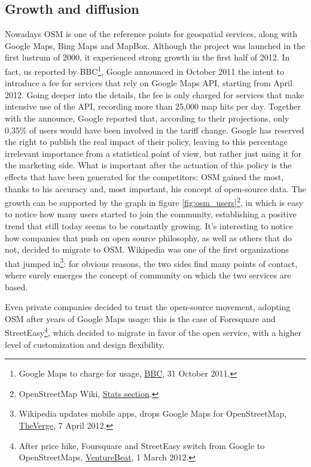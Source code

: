 \subsection{Growth and diffusion}
Nowadays OSM is one of the reference points for geospatial services, along with Google Maps, Bing Maps and MapBox. Although the project was launched in the first lustrum of 2000, it experienced strong growth in the first half of 2012.
In fact, us reported by BBC\footnote{Google Maps to charge for usage, \href{https://www.bbc.com/news/business-15523050}{BBC}, 31 October 2011.}, Google announced in October 2011 the intent to introduce a fee for services that rely on Google Maps API, starting from April 2012. Going deeper into the details, the fee is only charged for services that make intensive use of the API, recording more than 25,000 map hits per day. Together with the announce, Google reported that, according to their projections, only 0,35\% of users would have been involved in the tariff change. Google has reserved the right to publish the real impact of their policy, leaving to this percentage irrelevant importance from a statistical point of view, but rather just using it for the marketing side.
What is important after the actuation of this policy is the effects that have been generated for the competitors: OSM gained the most, thanks to his accuracy and, most important, his concept of open-source data.
The growth can be supported by the graph in figure \ref{fig:osm_users}\footnote{OpenStreetMap Wiki, \href{https://wiki.openstreetmap.org/wiki/Stats}{Stats section}.}, in which is easy to notice how many users started to join the community, establishing a positive trend that still today seems to be constantly growing.
It's interesting to notice how companies that push on open source philosophy, as well as others that do not, decided to migrate to OSM.
Wikipedia was one of the first organizations that jumped in\footnote{Wikipedia updates mobile apps, drops Google Maps for OpenStreetMap, \href{https://www.theverge.com/2012/4/7/2931320/wikipedia-updates-mobile-apps-drops-google-maps-for-openstreetmap}{TheVerge}, 7 April 2012.}: for obvious reasons, the two sides find many points of contact, where surely emerges the concept of community on which the two services are based.

Even private companies decided to trust the open-source movement, adopting OSM after years of Google Maps usage: this is the case of Foresquare and StreetEasy\footnote{After price hike, Foursquare and StreetEasy switch from Google to OpenStreetMaps, \href{https://venturebeat.com/2012/03/01/google-maps-api-price-foursquare-streeteasy-openstreetmaps/}{VentureBeat}, 1 March 2012.}, which decided to migrate in favor of the open service, with a higher level of customization and design flexibility.

